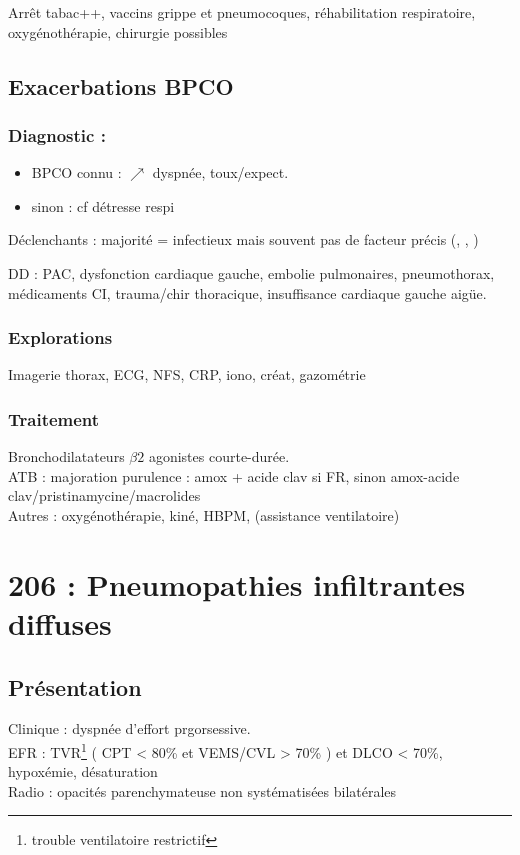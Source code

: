 Arrêt tabac++, vaccins grippe et pneumocoques, réhabilitation respiratoire, oxygénothérapie, chirurgie possibles

\subsection{Exacerbations BPCO}
\label{subsec:ebpco}
\subsubsection{Diagnostic :}
\begin{itemize}
\item BPCO connu : \(\nearrow\) dyspnée, toux/expect.
\item sinon : cf détresse respi
\end{itemize}

Déclenchants : majorité = infectieux mais souvent pas de facteur précis
(, , )

DD : PAC, dysfonction cardiaque gauche, embolie pulmonaires, pneumothorax, médicaments CI, trauma/chir thoracique, insuffisance cardiaque gauche aigüe.

\subsubsection{Explorations}
Imagerie thorax, ECG, NFS, CRP, iono, créat, gazométrie

\subsubsection{Traitement}
Bronchodilatateurs $\beta2$ agonistes courte-durée.\\
ATB : majoration purulence : amox + acide clav si FR, sinon amox-acide
clav/pristinamycine/macrolides\\
Autres \faHospitalO : oxygénothérapie, kiné, HBPM, (assistance ventilatoire)

\section{206 : Pneumopathies infiltrantes diffuses}
\subsection{Présentation}
Clinique : dyspnée d'effort prgorsessive.\\
EFR : TVR\footnote{trouble ventilatoire restrictif} ( CPT < 80\% et VEMS/CVL >
70\% ) et DLCO < 70\%, hypoxémie, désaturation\\
Radio : opacités parenchymateuse non systématisées bilatérales


